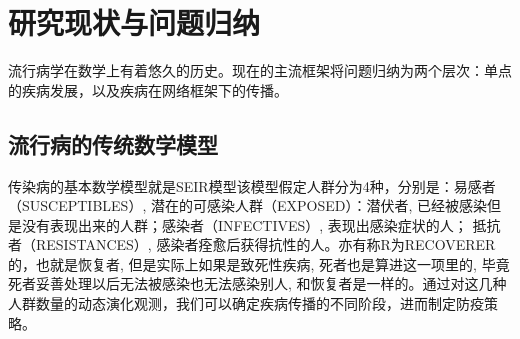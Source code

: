 \chapter{研究现状与问题归纳}

流行病学在数学上有着悠久的历史。现在的主流框架将问题归纳为两个层次：单点的疾病发展，以及疾病在网络框架下的传播。

\section{流行病的传统数学模型}

传染病的基本数学模型就是SEIR模型该模型假定人群分为4种，分别是：易感者（SUSCEPTIBLES）, 潜在的可感染人群（EXPOSED）：潜伏者, 已经被感染但是没有表现出来的人群；感染者（INFECTIVES）, 表现出感染症状的人； 抵抗者（RESISTANCES）, 感染者痊愈后获得抗性的人。亦有称R为RECOVERER的，也就是恢复者, 但是实际上如果是致死性疾病, 死者也是算进这一项里的, 毕竟死者妥善处理以后无法被感染也无法感染别人, 和恢复者是一样的。通过对这几种人群数量的动态演化观测，我们可以确定疾病传播的不同阶段，进而制定防疫策略。